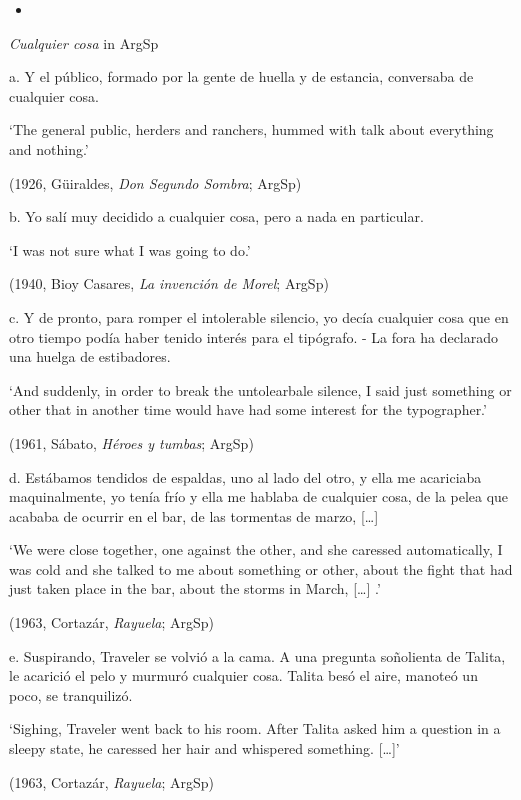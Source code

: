 \documentclass[output=paper]{langscibook}
\begin{document}
\begin{itemize}
\item \end{itemize}

  \textit{Cualquier cosa} in ArgSp

  a.  Y el público, formado por la gente de huella y de estancia, conversaba de cualquier cosa.

    ‘The general public, herders and ranchers, hummed with talk about everything and nothing.’

    (1926, Güiraldes, \textit{Don Segundo Sombra}; ArgSp)

  b.  Yo salí muy decidido a cualquier cosa, pero a nada en particular.

    ‘I was not sure what I was going to do.’

    (1940, Bioy Casares, \textit{La invención de Morel}; ArgSp)

  c.  Y de pronto, para romper el intolerable silencio, yo decía cualquier cosa que en otro tiempo podía haber tenido interés para el tipógrafo. - La fora ha declarado una huelga de estibadores.

    ‘And suddenly, in order to break the untolearbale silence, I said just something or other that in another time would have had some interest for the typographer.’

    (1961, Sábato, \textit{Héroes y tumbas}; ArgSp)

  d.  Estábamos tendidos de espaldas, uno al lado del otro, y ella me acariciaba maquinalmente, yo tenía frío y ella me hablaba de cualquier cosa, de la pelea que acababa de ocurrir en el bar, de las tormentas de marzo, […]

    ‘We were close together, one against the other, and she caressed automatically, I was cold and she talked to me about something or other, about the fight that had just taken place in the bar, about the storms in March, […] .’

    (1963, Cortazár, \textit{Rayuela}; ArgSp)

  e.  Suspirando, Traveler se volvió a la cama. A una pregunta soñolienta de Talita, le acarició el pelo y murmuró cualquier cosa. Talita besó el aire, manoteó un poco, se tranquilizó.

    ‘Sighing, Traveler went back to his room. After Talita asked him a question in a sleepy state, he caressed her hair and whispered something. […]’

    (1963, Cortazár, \textit{Rayuela}; ArgSp)
\end{document}
